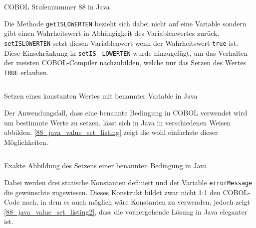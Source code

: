 \begin{listing}[H]
  \inputminted{java}{Code/88_section.java.txt}
  \caption{COBOL Stufennummer 88 in Java}
  \label{88_java_listing}
\end{listing} 

Die Methode \texttt{getISLOWERTEN} bezieht sich dabei nicht auf eine Variable sondern gibt einen Wahrheitswert in Abhängigkeit des Variablenwertes zurück. \texttt{setISLOWERTEN} setzt diesen Variablenwert wenn der Wahrheitswert \texttt{true} ist. Diese Einschränkung in \texttt{setIS-} \texttt{LOWERTEN} wurde hinzugefügt, um das Verhalten der meisten COBOL-Compiler nachzubilden, welche nur das Setzen des Wertes \texttt{TRUE} erlauben.

\begin{listing}[H]
  \inputminted{java}{Code/88_section_value_set.java.txt}
  \caption{Setzen eines konstanten Wertes mit benannter Variable in Java}
  \label{88_java_value_set_listing}
\end{listing} 

Der Anwendungsfall, dass eine benannte Bedingung in COBOL verwendet wird um bestimmte Werte zu setzen, lässt sich in Java in verschiedenen Weisen abbilden. \autoref{88_java_value_set_listing} zeigt die wohl einfachste dieser Möglichkeiten.

\begin{listing}[H]
  \inputminted{java}{Code/88_section_value_set2.java.txt}
  \caption{Exakte Abbildung des Setzens einer benannten Bedingung in Java}
  \label{88_java_value_set_listing2}
\end{listing} 

Dabei werden drei statische Konstanten definiert und der Variable \texttt{errorMessage} die gewünschte zugewiesen. Dieses Konstrukt bildet zwar nicht 1:1 den COBOL-Code nach, in dem es auch möglich wäre Konstanten zu verwenden, jedoch zeigt \autoref{88_java_value_set_listing2}, dass die vorhergehende Lösung in Java eleganter ist.